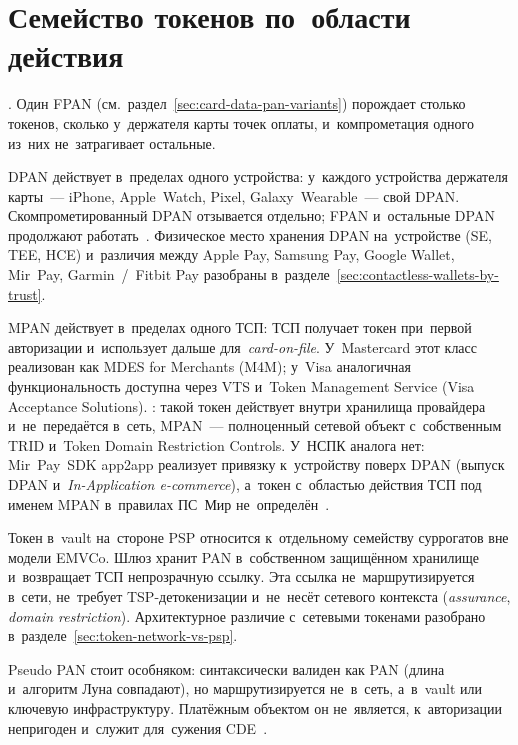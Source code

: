\section{Семейство токенов по~области действия}\label{sec:token-scope}

. Один FPAN (см.~раздел~\ref{sec:card-data-pan-variants})
порождает столько токенов, сколько у~держателя карты точек оплаты,
и~компрометация одного из~них не~затрагивает остальные.

DPAN действует в~пределах одного устройства: у~каждого устройства держателя
карты~--- iPhone, Apple~Watch, Pixel, Galaxy~Wearable~--- свой DPAN. Скомпрометированный DPAN отзывается отдельно; FPAN и~остальные
DPAN продолжают работать~\cite{emvco-payment-tokenisation,visa-vts}. Физическое
место хранения DPAN на~устройстве (SE, TEE, HCE) и~различия между Apple Pay,
Samsung Pay, Google Wallet, Mir~Pay, Garmin~/~Fitbit Pay разобраны
в~разделе~\ref{sec:contactless-wallets-by-trust}.

MPAN действует в~пределах одного ТСП: ТСП получает токен при~первой авторизации
и~использует дальше для~\textit{card-on-file}. У~Mastercard этот класс
реализован как MDES for Merchants (M4M); у~Visa аналогичная функциональность
доступна через VTS и~Token Management Service (Visa Acceptance Solutions).
: такой токен действует
внутри хранилища провайдера и~не~передаётся в~сеть, MPAN~--- полноценный сетевой
объект с~собственным TRID и~Token Domain Restriction Controls. У~НСПК аналога
нет: Mir~Pay~SDK app2app реализует привязку к~устройству поверх DPAN
(выпуск DPAN и~\textit{In-Application e-commerce}), а~токен с~областью
действия ТСП под именем MPAN в~правилах ПС~Мир
не~определён~\cite{nspk-tsp}.

Токен в~vault на~стороне PSP относится к~отдельному семейству суррогатов вне модели EMVCo. Шлюз хранит PAN
в~собственном защищённом хранилище и~возвращает ТСП непрозрачную ссылку. Эта
ссылка не~маршрутизируется в~сети, не~требует TSP-детокенизации и~не~несёт
сетевого контекста (\textit{assurance}, \textit{domain restriction}).
Архитектурное различие с~сетевыми токенами разобрано
в~разделе~\ref{sec:token-network-vs-psp}.

Pseudo PAN стоит особняком: синтаксически валиден как PAN (длина и~алгоритм
Луна совпадают), но маршрутизируется не~в~сеть, а~в~vault или ключевую
инфраструктуру. Платёжным объектом он не~является, к~авторизации непригоден
и~служит для~сужения CDE~\cite{pci-tokenization-guidelines,nist-sp-800-38g}.

